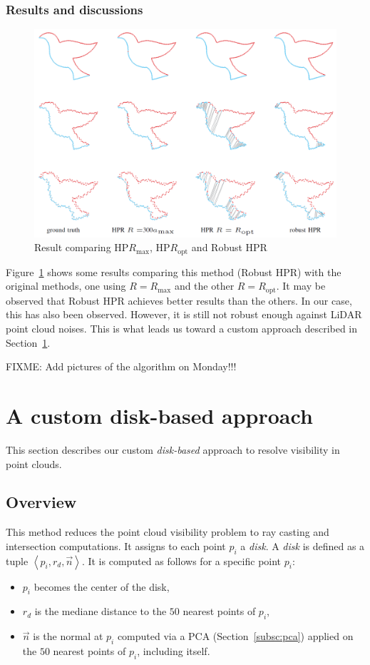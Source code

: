 \subsubsection{Results and discussions}
\begin{figure}
  \centering
  \includegraphics[scale=0.35]{img/rhpr-result.png}
  \caption{Result comparing HP$R_\text{max}$, HP$R_\text{opt}$ and Robust HPR}
  \label{fig:rhpr-result}
\end{figure}

Figure~\ref{fig:rhpr-result} shows some results comparing this method (Robust HPR) with the original methods, one using $R = R_\text{max}$ and the other $R = R_\text{opt}$. It may be observed that Robust HPR achieves better results than the others. In our case, this has also been observed. However, it is still not robust enough against LiDAR point cloud noises. This is what leads us toward a custom approach described in Section~\ref{sc:custom}.

FIXME: Add pictures of the algorithm on Monday!!!

\section{A custom disk-based approach}
\label{sc:custom}
This section describes our custom \emph{disk-based} approach to resolve visibility in point clouds.

\subsection{Overview}
\label{subsc:custom-overview}
This method reduces the point cloud visibility problem to ray casting and intersection computations. It assigns to each point $p_i$ a \emph{disk}. A \emph{disk} is defined as a tuple $\left\langle p_i, r_d, \vec{n} \right\rangle$. It is computed as follows for a specific point $p_i$:
\begin{itemize}
  \item $p_i$ becomes the center of the disk,
  \item $r_d$ is the mediane distance to the $50$ nearest points of $p_i$,
  \item $\vec{n}$ is the normal at $p_i$ computed via a PCA (Section~\ref{subsc:pca}) applied on the $50$ nearest points of $p_i$, including itself.
\end{itemize}

